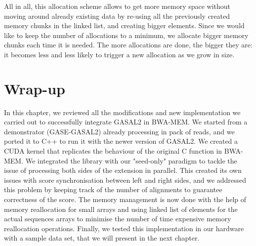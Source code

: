 All in all, this allocation scheme allows to get more memory space without moving around already existing data by re-using all the previously created memory chunks in the linked list, and creating bigger elements. Since we would like to keep the number of allocations to a minimum, we allocate bigger memory chunks each time it is needed. The more allocations are done, the bigger they are: it becomes less and less likely to trigger a new allocation as we grow in size.

\section*{Wrap-up}
In this chapter, we reviewed all the modifications and new implementation we carried out to successfully integrate GASAL2 in BWA-MEM. We started from a demonstrator (GASE-GASAL2) already processing in pack of reads, and we ported it to C++ to run it with the newer version of GASAL2. We created a CUDA kernel that replicates the behaviour of the original C function in BWA-MEM. We integrated the library with our "seed-only" paradigm to tackle the issue of processing both sides of the extension in parallel. This created its own issues with score synchronisation between left and right sides, and we addressed this problem by keeping track of the number of alignments to guarantee correctness of the score. The memory management is now done with the help of memory reallocation for small arrays and using linked list of elements for the actual sequences arrays to minimise the number of time expensive memory reallocation operations. Finally, we tested this implementation in our hardware with a sample data set, that we will present in the next chapter.


